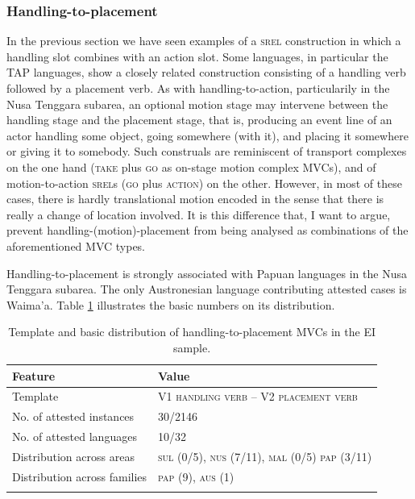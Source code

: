 \subsubsection{Handling-to-placement} \label{sec:handling-to-placement}
In the previous section we have seen examples of a \textsc{srel} construction in which a handling slot combines with an action slot. Some languages, in particular the \textsc{TAP} languages, show a closely related construction consisting of a handling verb followed by a placement verb. As with handling-to-action, particularily in the Nusa Tenggara subarea, an optional motion stage may intervene between the handling stage and the placement stage, that is, producing an event line of an actor handling some object, going somewhere (with it), and placing it somewhere or giving it to somebody. Such construals are reminiscent of transport complexes on the one hand (\textsc{take} plus \textsc{go} as on-stage motion complex MVCs), and of motion-to-action \textsc{srel}s (\textsc{go} plus \textsc{action}) on the other. However, in most of these cases, there is hardly translational motion encoded in the sense that there is really a change of location involved. It is this difference that, I want to argue, prevent handling-(motion)-placement from being analysed as combinations of the aforementioned MVC types.

Handling-to-placement is strongly associated with Papuan languages in the Nusa Tenggara subarea. The only Austronesian language contributing attested cases is Waima'a. Table \ref{table:handling-to-placement} illustrates the basic numbers on its distribution.

\begin{table}
\begin{tabular}{ll}
\lsptoprule
Feature&Value\tabularnewline
\midrule
Template&V1 \textsc{handling verb} -- V2 \textsc{placement verb}\tabularnewline
No. of attested instances& 30/2146 \tabularnewline
No. of attested languages& 10/32 \tabularnewline
Distribution across areas& \textsc{sul} (0/5), \textsc{nus} (7/11), \textsc{mal} (0/5) \textsc{pap} (3/11) \tabularnewline
Distribution across families& \textsc{pap} (9), \textsc{aus} (1) \tabularnewline
\lspbottomrule
\end{tabular}
\caption[Template and basic distribution of handling-to-placement MVCs]{Template and basic distribution of handling-to-placement MVCs in the EI sample.}
\label{table:handling-to-placement}
\end{table}

